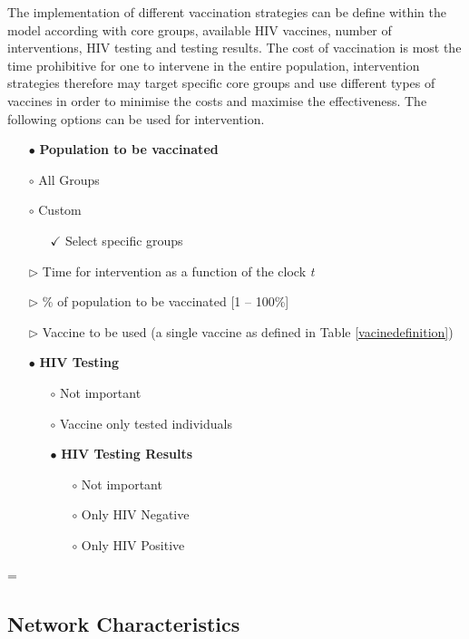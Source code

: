 The implementation of different vaccination strategies can be define within the model
according with core groups, available HIV vaccines, number of interventions, HIV testing
and testing results. The cost of vaccination is most the time prohibitive for one to
intervene in the entire population, intervention strategies therefore may target specific
core groups and use different types of vaccines in order to minimise the costs and
maximise the effectiveness. The following options can be used for intervention.
\parskip=0pt
\begin{itemize}
    \item [$\bullet$] \textbf{Population to be vaccinated}
    \item [$\circ$] All Groups
    \item [$\circ$] Custom
    \begin{itemize}
    \item [$\checkmark$] Select specific groups
    \end{itemize}
    \item [$\triangleright$]Time for intervention as a function of the clock \emph{t}
    \item [$\triangleright$] \% of population to be vaccinated [1 -- 100\%]
    \item [$\triangleright$]Vaccine to be used (a single vaccine as defined in Table \ref{vacinedefinition})
    \item [$\bullet$] \textbf{HIV Testing}
    \begin{itemize}
        \item [$\circ$] Not important
        \item [$\circ$] Vaccine only tested individuals
        \item [$\bullet$] \textbf{HIV Testing Results}
        \begin{itemize}
            \item [$\circ$] Not important
            \item [$\circ$] Only HIV Negative
            \item [$\circ$] Only HIV Positive
        \end{itemize}
    \end{itemize}
\end{itemize}
\parskip=\baselineskip

\subsection{Network Characteristics}

